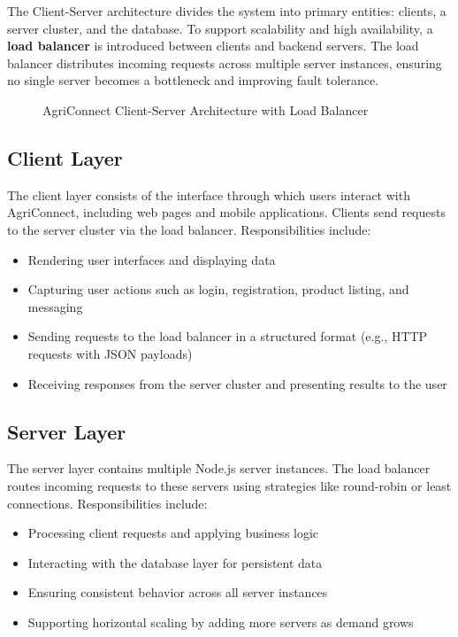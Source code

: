 \documentclass[12pt,a4paper]{article}
\begin{document}
The Client-Server architecture divides the system into primary entities: clients, a server cluster, and the database. To support scalability and high availability, a \textbf{load balancer} is introduced between clients and backend servers. The load balancer distributes incoming requests across multiple server instances, ensuring no single server becomes a bottleneck and improving fault tolerance.

\begin{figure}[H]
\centering
{}
\caption{AgriConnect Client-Server Architecture with Load Balancer}
\end{figure}

\subsection{Client Layer}

The client layer consists of the interface through which users interact with AgriConnect, including web pages and mobile applications. Clients send requests to the server cluster via the load balancer. Responsibilities include:

\begin{itemize}
    \item Rendering user interfaces and displaying data
    \item Capturing user actions such as login, registration, product listing, and messaging
    \item Sending requests to the load balancer in a structured format (e.g., HTTP requests with JSON payloads)
    \item Receiving responses from the server cluster and presenting results to the user
\end{itemize}

\subsection{Server Layer}

The server layer contains multiple Node.js server instances. The load balancer routes incoming requests to these servers using strategies like round-robin or least connections. Responsibilities include:

\begin{itemize}
    \item Processing client requests and applying business logic
    \item Interacting with the database layer for persistent data
    \item Ensuring consistent behavior across all server instances
    \item Supporting horizontal scaling by adding more servers as demand grows
\end{itemize}
\end{document}
